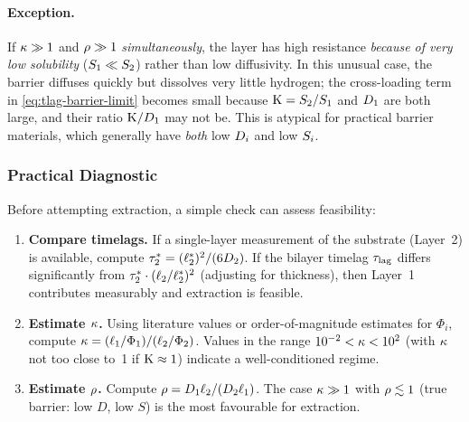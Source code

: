 \paragraph{Exception.}
If $\kappa \gg 1$ and $\rho \gg 1$ \emph{simultaneously}, the layer has
high resistance \emph{because of very low solubility} ($S_{1} \ll S_{2}$)
rather than low diffusivity.  In this unusual case, the barrier diffuses
quickly but dissolves very little hydrogen; the cross-loading term in
\cref{eq:tlag-barrier-limit} becomes small because $\mathrm{K} = S_{2}/S_{1}$
and $D_{1}$ are both large, and their ratio $\mathrm{K}/D_{1}$ may not be.
This is atypical for practical barrier materials, which generally have
\emph{both} low $D_{i}$ and low $S_{i}$.

\subsubsection{Practical Diagnostic}

Before attempting extraction, a simple check can assess feasibility:

\begin{enumerate}
  \item \textbf{Compare timelags.}
    If a single-layer measurement of the substrate (Layer~2) is available,
    compute $\tau_2^* = (\ell_{2}^*)^2/(6D_{2})$.  If the bilayer timelag
    $\tau_{\mathrm{lag}}$ differs significantly from $\tau_2^*\cdot(\ell_{2}/\ell_{2}^*)^2$
    (adjusting for thickness), then Layer~1 contributes measurably and
    extraction is feasible.
  \item \textbf{Estimate $\kappa$.}
    Using literature values or order-of-magnitude estimates for $\Phi_i$,
    compute $\kappa = (\ell_{1}/\Phi_1)/(\ell_{2}/\Phi_2)$.
    Values in the range $10^{-2} < \kappa < 10^2$ (with $\kappa$ not too close
    to~1 if $\mathrm{K} \approx 1$) indicate a well-conditioned regime.
  \item \textbf{Estimate $\rho$.}
    Compute $\rho = D_{1}\ell_{2}/(D_{2}\ell_{1})$.
    The case $\kappa \gg 1$ with $\rho \lesssim 1$ (true barrier: low $D$,
    low $S$) is the most favourable for extraction.
\end{enumerate}

